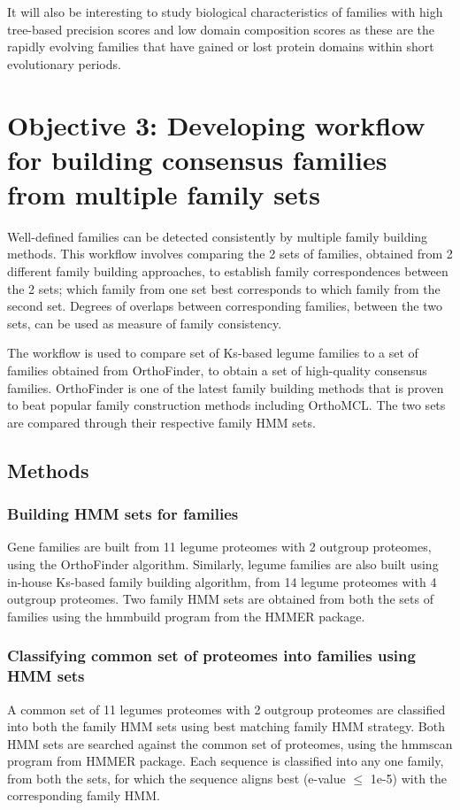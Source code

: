 \documentclass{article}
\begin{document}
	It will also be interesting to study biological characteristics of families with high tree-based precision scores and low domain composition scores as these are the rapidly evolving families that have gained or lost protein domains within short evolutionary periods.
	
	\pagebreak
	\section{Objective 3: Developing workflow for building consensus families from multiple family sets}
	Well-defined families can be detected consistently by multiple family building methods. This workflow involves comparing the 2 sets of families, obtained from 2 different family building approaches, to establish family correspondences between the 2 sets; which family from one set best corresponds to which family from the second set. Degrees of overlaps between corresponding families, between the two sets, can be used as measure of family consistency.
	
	The workflow is used to compare set of Ks-based legume families to a set of families obtained from OrthoFinder, to obtain a set of high-quality consensus families. OrthoFinder is one of the latest family building methods that is proven to beat popular family construction methods including OrthoMCL. The two sets are compared through their respective family HMM sets.
	
		\subsection{Methods}
			\subsubsection{Building HMM sets for families}
			Gene families are built from 11 legume proteomes with 2 outgroup proteomes, using the OrthoFinder algorithm. Similarly, legume families are also built using in-house Ks-based family building algorithm, from 14 legume proteomes with 4 outgroup proteomes. Two family HMM sets are obtained from both the sets of families using the hmmbuild program from the HMMER package.
			
			\subsubsection{Classifying common set of proteomes into families using HMM sets}
			A common set of 11 legumes proteomes with 2 outgroup proteomes are classified into both the family HMM sets using best matching family HMM strategy. Both HMM sets are searched against the common set of proteomes, using the hmmscan program from HMMER package. Each sequence is classified into any one family, from both the sets, for which the sequence aligns best (e-value $\leq$ 1e-5) with the corresponding family HMM.
			
\end{document}
